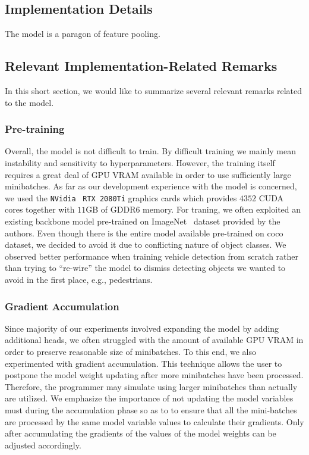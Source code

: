 \subsection{Implementation Details}

The \siammot{} model is a paragon of feature pooling.

\subsection{Relevant Implementation-Related Remarks}

In this short section, we would like to summarize several relevant remarks related to the \siammot{} model. 

\subsubsection{Pre-training}

Overall, the model is not difficult to train. By difficult training we mainly mean instability and sensitivity to hyperparameters. However, the training itself requires a great deal of GPU VRAM available in order to use sufficiently large minibatches. As far as our development experience with the \siammot{} model is concerned, we used the \texttt{NVidia}~\cite{webnvidia} \texttt{RTX 2080Ti} graphics cards which provides $4352$ CUDA cores together with $11$GB of GDDR6 memory. For traning, we often exploited an existing backbone model pre-trained on ImageNet~\cite{deng2009imagenet} dataset provided by the authors. Even though there is the entire model available pre-trained on \gls{coco}~\cite{lin2014mscoco} dataset, we decided to avoid it due to conflicting nature of object classes. We observed better performance when training vehicle detection from scratch rather than trying to ``re-wire'' the model to dismiss detecting objects we wanted to avoid in the first place, e.g., pedestrians.

\subsubsection{Gradient Accumulation}

Since majority of our experiments involved expanding the model by adding additional heads, we often struggled with the amount of available GPU VRAM in order to preserve reasonable size of minibatches. To this end, we also experimented with gradient accumulation. This technique allows the user to postpone the model weight updating after more minibatches have been processed. Therefore, the programmer may simulate using larger minibatches than actually are utilized. We emphasize the importance of not updating the model variables must during the accumulation phase so as to to ensure that all the mini-batches are processed by the same model variable values to calculate their gradients. Only after accumulating the gradients of the values of the model weights can be adjusted accordingly.

